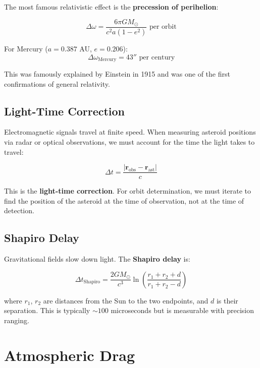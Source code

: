 The most famous relativistic effect is the \textbf{precession of perihelion}:

\begin{equation}
    \Delta\omega = \frac{6\pi G M_\odot}{c^2 a(1-e^2)} \text{ per orbit}
\end{equation}

For Mercury ($a = 0.387$ AU, $e = 0.206$):
\begin{equation}
    \Delta\omega_{\text{Mercury}} = 43'' \text{ per century}
\end{equation}

This was famously explained by Einstein in 1915 and was one of the first confirmations of general relativity.

\subsection{Light-Time Correction}

Electromagnetic signals travel at finite speed. When measuring asteroid positions via radar or optical observations, we must account for the time the light takes to travel:

\begin{equation}
    \Delta t = \frac{|\mathbf{r}_{\text{obs}} - \mathbf{r}_{\text{ast}}|}{c}
\end{equation}

This is the \textbf{light-time correction}. For orbit determination, we must iterate to find the position of the asteroid at the time of observation, not at the time of detection.

\subsection{Shapiro Delay}

Gravitational fields slow down light. The \textbf{Shapiro delay} is:

\begin{equation}
    \Delta t_{\text{Shapiro}} = \frac{2GM_\odot}{c^3}\ln\left(\frac{r_1 + r_2 + d}{r_1 + r_2 - d}\right)
\end{equation}

where $r_1$, $r_2$ are distances from the Sun to the two endpoints, and $d$ is their separation. This is typically $\sim 100$ microseconds but is measurable with precision ranging.

\section{Atmospheric Drag}

